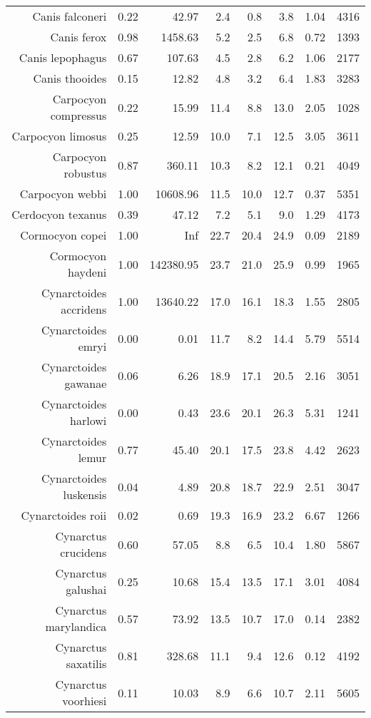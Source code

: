 \begin{table}[ht]
\begin{tabular}{rrrrrrrr}
  Canis falconeri & 0.22 & 42.97 & 2.4 & 0.8 & 3.8 & 1.04 & 4316 \\ 
  Canis ferox & 0.98 & 1458.63 & 5.2 & 2.5 & 6.8 & 0.72 & 1393 \\ 
  Canis lepophagus & 0.67 & 107.63 & 4.5 & 2.8 & 6.2 & 1.06 & 2177 \\ 
  Canis thooides & 0.15 & 12.82 & 4.8 & 3.2 & 6.4 & 1.83 & 3283 \\ 
  Carpocyon compressus & 0.22 & 15.99 & 11.4 & 8.8 & 13.0 & 2.05 & 1028 \\ 
  Carpocyon limosus & 0.25 & 12.59 & 10.0 & 7.1 & 12.5 & 3.05 & 3611 \\ 
  Carpocyon robustus & 0.87 & 360.11 & 10.3 & 8.2 & 12.1 & 0.21 & 4049 \\ 
  Carpocyon webbi & 1.00 & 10608.96 & 11.5 & 10.0 & 12.7 & 0.37 & 5351 \\ 
  Cerdocyon texanus & 0.39 & 47.12 & 7.2 & 5.1 & 9.0 & 1.29 & 4173 \\ 
  Cormocyon copei & 1.00 & Inf & 22.7 & 20.4 & 24.9 & 0.09 & 2189 \\ 
  Cormocyon haydeni & 1.00 & 142380.95 & 23.7 & 21.0 & 25.9 & 0.99 & 1965 \\ 
  Cynarctoides accridens & 1.00 & 13640.22 & 17.0 & 16.1 & 18.3 & 1.55 & 2805 \\ 
  Cynarctoides emryi & 0.00 & 0.01 & 11.7 & 8.2 & 14.4 & 5.79 & 5514 \\ 
  Cynarctoides gawanae & 0.06 & 6.26 & 18.9 & 17.1 & 20.5 & 2.16 & 3051 \\ 
  Cynarctoides harlowi & 0.00 & 0.43 & 23.6 & 20.1 & 26.3 & 5.31 & 1241 \\ 
  Cynarctoides lemur & 0.77 & 45.40 & 20.1 & 17.5 & 23.8 & 4.42 & 2623 \\ 
  Cynarctoides luskensis & 0.04 & 4.89 & 20.8 & 18.7 & 22.9 & 2.51 & 3047 \\ 
  Cynarctoides roii & 0.02 & 0.69 & 19.3 & 16.9 & 23.2 & 6.67 & 1266 \\ 
  Cynarctus crucidens & 0.60 & 57.05 & 8.8 & 6.5 & 10.4 & 1.80 & 5867 \\ 
  Cynarctus galushai & 0.25 & 10.68 & 15.4 & 13.5 & 17.1 & 3.01 & 4084 \\ 
  Cynarctus marylandica & 0.57 & 73.92 & 13.5 & 10.7 & 17.0 & 0.14 & 2382 \\ 
  Cynarctus saxatilis & 0.81 & 328.68 & 11.1 & 9.4 & 12.6 & 0.12 & 4192 \\ 
  Cynarctus voorhiesi & 0.11 & 10.03 & 8.9 & 6.6 & 10.7 & 2.11 & 5605 \\ 

\end{tabular}
\end{table}
